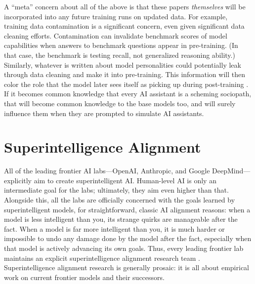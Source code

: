 A ``meta'' concern about all of the above is that these papers
\emph{themselves} will be incorporated into any future training runs on updated
data. For example, training data contamination is a significant concern, even
given significant data cleaning efforts. Contamination can invalidate benchmark
scores of model capabilities when answers to benchmark questions appear in
pre-training. (In that case, the benchmark is testing recall, not generalized
reasoning ability.) Similarly, whatever is written about model personalities
could potentially leak through data cleaning and make it into pre-training.
This information will then color the role that the model later sees itself as
picking up during post-training \cite{nostalgebraist2025void}. If it becomes
common knowledge that every AI assistant is a scheming sociopath, that will
become common knowledge to the base models too, and will surely influence them
when they are prompted to simulate AI assistants.

\section{Superintelligence Alignment}


All of the leading frontier AI labs---OpenAI, Anthropic, and Google
DeepMind---explicitly aim to create superintelligent AI. Human-level AI is only
an intermediate goal for the labs; ultimately, they aim even higher than that.
Alongside this, all the labs are officially concerned with the goals learned by
superintelligent models, for straightforward, classic AI alignment reasons:
when a model is less intelligent than you, its strange quirks are manageable
after the fact. When a model is far more intelligent than you, it is much
harder or impossible to undo any damage done by the model after the fact,
especially when that model is actively advancing its own goals. Thus, every
leading frontier lab maintains an explicit superintelligence alignment research
team \cite{leike2023superalignment,anthropic2025rsp}. Superintelligence
alignment research is generally prosaic: it is all about empirical work on
current frontier models and their successors.

